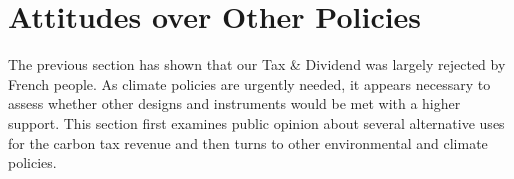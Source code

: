 \documentclass[english,5p,authoryear]{elsarticle}
\begin{document}




\section{Attitudes over Other Policies}\label{sec:attitudes_other_policies}

The previous section has shown that our Tax \& Dividend was largely rejected by French people. As climate policies are urgently needed, it appears necessary to assess whether other designs and instruments would be met with a higher support. This section first examines public opinion about several alternative uses for the carbon tax revenue and then turns to other environmental and climate policies.
\end{document}
